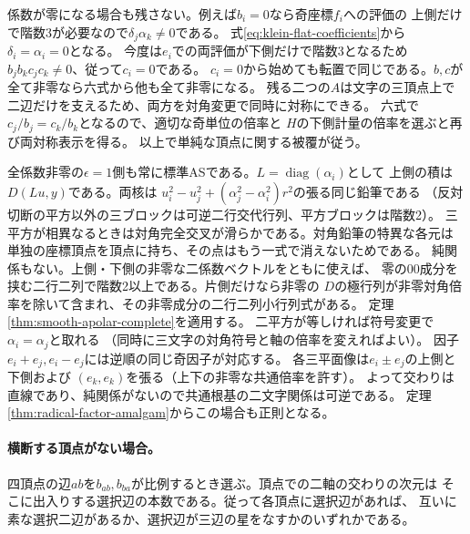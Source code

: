 係数が零になる場合も残さない。例えば$b_i=0$なら奇座標$f_i$への評価の
上側だけで階数3が必要なので$\delta_j\alpha_k\ne0$である。
式\eqref{eq:klein-flat-coefficients}から$\delta_i=\alpha_i=0$となる。
今度は$e_i$での両評価が下側だけで階数3となるため
$b_jb_kc_jc_k\ne0$、従って$c_i=0$である。
$c_i=0$から始めても転置で同じである。$b,c$が全て非零なら六式から他も全て非零になる。
残る二つの$A$は文字の三頂点上で二辺だけを支えるため、両方を対角変更で同時に対称にできる。
六式で$c_j/b_j=c_k/b_k$となるので、適切な奇単位の倍率と
$H$の下側計量の倍率を選ぶと再び両対称表示を得る。
以上で単純な頂点に関する被覆が従う。
\begin{remark}
全係数非零の$\epsilon=1$側も常に標準ASである。$L=\operatorname{diag}(\alpha_i)$として
上側の積は$D(Lu,y)$である。両核は
$u_i^2-u_j^2+(\alpha_j^2-\alpha_i^2)r^2$の張る同じ鉛筆である
（反対切断の平方以外の三ブロックは可逆二行交代行列、平方ブロックは階数2）。
三平方が相異なるときは対角完全交叉が滑らかである。対角鉛筆の特異な各元は
単独の座標頂点を頂点に持ち、その点はもう一式で消えないためである。
純関係もない。上側・下側の非零な二係数ベクトルをともに使えば、
零の$00$成分を挟む二行二列で階数2以上である。片側だけなら非零の
$D$の極行列が非零対角倍率を除いて含まれ、その非零成分の二行二列小行列式がある。
定理\ref{thm:smooth-apolar-complete}を適用する。
二平方が等しければ符号変更で$\alpha_i=\alpha_j$と取れる
（同時に三文字の対角符号と軸の倍率を変えればよい）。
因子$e_i+e_j,e_i-e_j$には逆順の同じ奇因子が対応する。
各三平面像は$e_i\pm e_j$の上側と下側および
$(e_k,e_k)$を張る（上下の非零な共通倍率を許す）。
よって交わりは直線であり、純関係がないので共通根基の二文字関係は可逆である。
定理\ref{thm:radical-factor-amalgam}からこの場合も正則となる。
\end{remark}

\paragraph{横断する頂点がない場合。}
四頂点の辺$ab$を$b_{ab},b_{ba}$が比例するとき選ぶ。頂点での二軸の交わりの次元は
そこに出入りする選択辺の本数である。従って各頂点に選択辺があれば、
互いに素な選択二辺があるか、選択辺が三辺の星をなすかのいずれかである。

